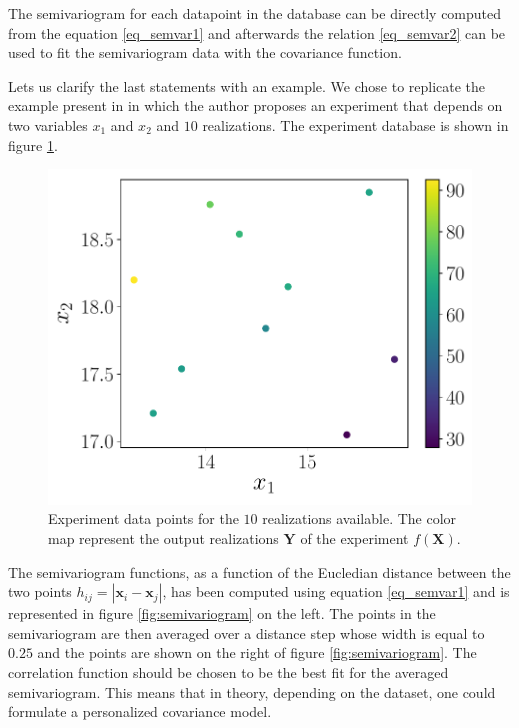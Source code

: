 The semivariogram for each datapoint in the database can be directly computed from the equation \eqref{eq_semvar1} and afterwards the relation \eqref{eq_semvar2} can be used to fit the semivariogram data with the covariance function.

Lets us clarify the last statements with an example. We chose to replicate the example present in \citet{cavazzuti2012optimization} in which the author proposes an experiment that depends on two variables $x_1$ and $x_2$ and $10$ realizations. The experiment database is shown in figure \ref{fig:doedata}.

\begin{figure}[t]
	\centering
	\includegraphics[width=0.5\linewidth]{appendix_a/DOE_data}
	\caption{Experiment data points for the $10$ realizations available. The color map represent the output realizations  $\mathbf{Y}$ of the experiment $f(\mathbf{X})$.}
	\label{fig:doedata}
\end{figure}

The semivariogram functions, as a function of the Eucledian distance between the two points $h_{ij} = |\mathbf{x}_i - \mathbf{x}_j|$, has been computed using equation \eqref{eq_semvar1} and is represented in figure \ref{fig:semivariogram} on the left. The points in the semivariogram are then averaged over a distance step whose width is equal to $0.25$ and the points are shown on the right of figure \ref{fig:semivariogram}.
The correlation function should be chosen to be the best fit for the averaged semivariogram. This means that in theory, depending on the dataset, one could formulate a personalized covariance model.

